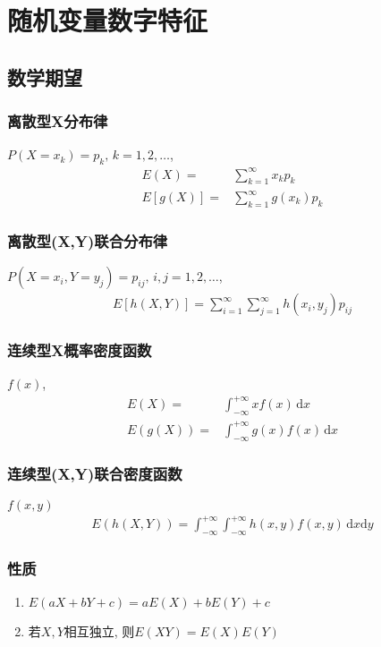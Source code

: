 \newpage
\section{随机变量数字特征}
\subsection{数学期望}
\subsubsection{离散型X分布律}
$P(X=x_k)=p_k,\,k=1,2,\dots$, 
\begin{align*}
    E(X)=&\sum_{k=1}^{\infty}x_k p_k\\
    E\left[g(X)\right]=&\sum_{k=1}^{\infty}g(x_k)p_k
\end{align*}
\subsubsection{离散型(X,Y)联合分布律}
$P(X=x_i,Y=y_j)=p_{ij},\,i,j=1,2,\dots$,
\begin{align*}
    E\left[ h(X,Y) \right]=\sum_{i=1}^{\infty}\sum_{j=1}^{\infty}h(x_i,y_j)p_{ij}
\end{align*}

\subsubsection{连续型X概率密度函数}
$f(x)$,
\begin{align*}
    E(X)=&\int_{-\infty}^{+\infty}xf(x)\,\mathrm{d}x\\
    E(g(X))=&\int_{-\infty}^{+\infty}g(x)f(x)\,\mathrm{d}x
\end{align*}
\subsubsection{连续型(X,Y)联合密度函数}
$f(x,y)$
\begin{align*}
    E\left(h(X,Y)\right)=\int_{-\infty}^{+\infty}\int_{-\infty}^{+\infty}h(x,y)f(x,y)\,\mathrm{d}x\mathrm{d}y
\end{align*}

\subsubsection{性质}
\begin{enumerate}
    \item $E(aX+bY+c)=aE(X)+bE(Y)+c$
    \item 若$X,Y$相互独立, 则$E(XY)=E(X)E(Y)$
\end{enumerate}


